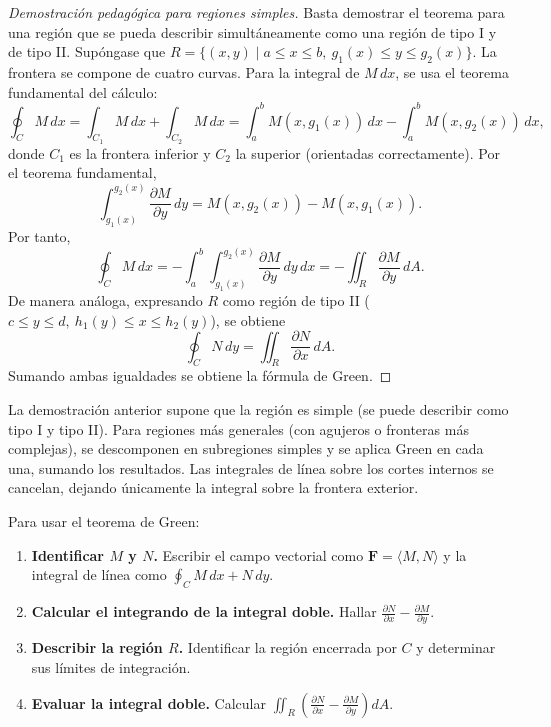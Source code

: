 \begin{proof}[Demostración pedagógica para regiones simples]
Basta demostrar el teorema para una región que se pueda describir
simultáneamente como una región de tipo I y de tipo II. Supóngase que
$R = \{(x,y) \mid a \le x \le b,\ g_1(x) \le y \le g_2(x)\}$. La
frontera se compone de cuatro curvas. Para la integral de $M\,dx$,
se usa el teorema fundamental del cálculo:
\[
\oint_C M\,dx
= \int_{C_1} M\,dx + \int_{C_2} M\,dx
= \int_a^b M(x,g_1(x))\,dx - \int_a^b M(x,g_2(x))\,dx,
\]
donde $C_1$ es la frontera inferior y $C_2$ la superior (orientadas
correctamente). Por el teorema fundamental,
\[
\int_{g_1(x)}^{g_2(x)} \frac{\partial M}{\partial y}\,dy
= M(x,g_2(x)) - M(x,g_1(x)).
\]
Por tanto,
\[
\oint_C M\,dx = - \int_a^b \int_{g_1(x)}^{g_2(x)}
\frac{\partial M}{\partial y}\,dy\,dx
= -\iint_R \frac{\partial M}{\partial y}\,dA.
\]
De manera análoga, expresando $R$ como región de tipo II
($c \le y \le d,\ h_1(y) \le x \le h_2(y)$), se obtiene
\[
\oint_C N\,dy = \iint_R \frac{\partial N}{\partial x}\,dA.
\]
Sumando ambas igualdades se obtiene la fórmula de Green.
\end{proof}

\begin{rem}
La demostración anterior supone que la región es simple (se puede
describir como tipo I y tipo II). Para regiones más generales (con
agujeros o fronteras más complejas), se descomponen en subregiones
simples y se aplica Green en cada una, sumando los resultados. Las
integrales de línea sobre los cortes internos se cancelan, dejando
únicamente la integral sobre la frontera exterior.
\end{rem}

\begin{pasos}
Para usar el teorema de Green:
\begin{enumerate}
    \item \textbf{Identificar $M$ y $N$.} Escribir el campo vectorial
    como $\mathbf{F}=\langle M,N \rangle$ y la integral de línea como
    $\oint_C M\,dx + N\,dy$.
    \item \textbf{Calcular el integrando de la integral doble.}
    Hallar $\displaystyle \frac{\partial N}{\partial x} -
    \frac{\partial M}{\partial y}$.
    \item \textbf{Describir la región $R$.} Identificar la región
    encerrada por $C$ y determinar sus límites de integración.
    \item \textbf{Evaluar la integral doble.} Calcular
    $\displaystyle \iint_R \left( \frac{\partial N}{\partial x} -
    \frac{\partial M}{\partial y} \right) dA$.
\end{enumerate}
\end{pasos}

